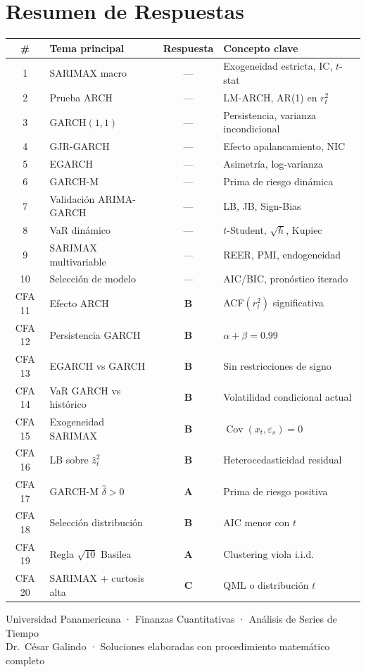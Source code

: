 \documentclass[12pt,a4paper]{article}
\DeclareMathOperator{\Cov}{Cov}
\begin{document}
\clearpage
\section{Resumen de Respuestas}

\begin{center}
\begin{tabular}{clcl}
\toprule
\# & Tema principal & Respuesta & Concepto clave\\
\midrule
1 & SARIMAX macro & — & Exogeneidad estricta, IC, $t$-stat\\
2 & Prueba ARCH & — & LM-ARCH, AR(1) en $r_t^2$\\
3 & GARCH$(1,1)$ & — & Persistencia, varianza incondicional\\
4 & GJR-GARCH & — & Efecto apalancamiento, NIC\\
5 & EGARCH & — & Asimetría, log-varianza\\
6 & GARCH-M & — & Prima de riesgo dinámica\\
7 & Validación ARIMA-GARCH & — & LB, JB, Sign-Bias\\
8 & VaR dinámico & — & $t$-Student, $\sqrt{h}$, Kupiec\\
9 & SARIMAX multivariable & — & REER, PMI, endogeneidad\\
10 & Selección de modelo & — & AIC/BIC, pronóstico iterado\\
\midrule
CFA 11 & Efecto ARCH & \textbf{B} & ACF$(r_t^2)$ significativa\\
CFA 12 & Persistencia GARCH & \textbf{B} & $\alpha+\beta=0.99$\\
CFA 13 & EGARCH vs GARCH & \textbf{B} & Sin restricciones de signo\\
CFA 14 & VaR GARCH vs histórico & \textbf{B} & Volatilidad condicional actual\\
CFA 15 & Exogeneidad SARIMAX & \textbf{B} & $\Cov(x_t,\varepsilon_s)=0$\\
CFA 16 & LB sobre $\hat{z}_t^2$ & \textbf{B} & Heterocedasticidad residual\\
CFA 17 & GARCH-M $\hat{\delta}>0$ & \textbf{A} & Prima de riesgo positiva\\
CFA 18 & Selección distribución & \textbf{B} & AIC menor con $t$\\
CFA 19 & Regla $\sqrt{10}$ Basilea & \textbf{A} & Clustering viola i.i.d.\\
CFA 20 & SARIMAX + curtosis alta & \textbf{C} & QML o distribución $t$\\
\bottomrule
\end{tabular}
\end{center}

\vfill
\begin{center}
{\small\color{gray}
Universidad Panamericana · Finanzas Cuantitativas · Análisis de Series de Tiempo\\
Dr.\ César Galindo · Soluciones elaboradas con procedimiento matemático completo
}
\end{center}
\end{document}

